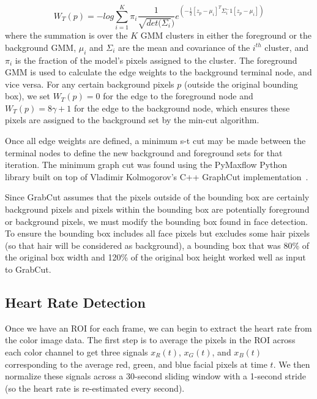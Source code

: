 \documentclass[10pt,twocolumn,letterpaper]{article}
\begin{document}
$$W_T(p) = - log \sum_{i=1}^K \pi_i \frac{1}{\sqrt{det(\Sigma_i})} e^{(-\frac{1}{2}[z_p-\mu_i]^T \Sigma_i^-1 [z_p - \mu_i])}$$
where the summation is over the $K$ GMM clusters in either the foreground or the background GMM, $\mu_i$ and $\Sigma_i$ are the mean and covariance of the $i^{th}$ cluster, and $\pi_i$ is the fraction of the model's pixels assigned to the cluster. The foreground GMM is used to calculate the edge weights to the background terminal node, and vice versa. For any certain background pixels $p$ (outside the original bounding box), we set $W_T(p) = 0$ for the edge to the foreground node and $W_T(p) = 8\gamma + 1$ for the edge to the background node, which ensures these pixels are assigned to the background set by the min-cut algorithm.

Once all edge weights are defined, a minimum s-t cut may be made between the terminal nodes to define the new background and foreground sets for that iteration. The minimum graph cut was found using the PyMaxflow Python library built on top of Vladimir Kolmogorov's C++ GraphCut implementation~\cite{Boykov:2004aa}.

Since GrabCut assumes that the pixels outside of the bounding box are certainly background pixels and pixels within the bounding box are potentially foreground or background pixels, we must modify the bounding box found in face detection. To ensure the bounding box includes all face pixels but excludes some hair pixels (so that hair will be considered as background), a bounding box that was 80\% of the original box width and 120\% of the original box height worked well as input to GrabCut.

\subsection{Heart Rate Detection}

Once we have an ROI for each frame, we can begin to extract the heart rate from the color image data. The first step is to average the pixels in the ROI across each color channel to get three signals $x_R(t)$, $x_G(t)$, and $x_B(t)$ corresponding to the average red, green, and blue facial pixels at time $t$. We then normalize these signals across a 30-second sliding window with a 1-second stride (so the heart rate is re-estimated every second).
\end{document}
